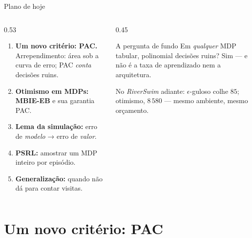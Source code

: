 \documentclass[aspectratio=169, 11pt]{beamer}
\begin{document}
\begin{frame}{Plano de hoje}
  \begin{columns}[T]
    \begin{column}{0.53\textwidth}
      \begin{enumerate}
        \item \textbf{Um novo critério: PAC.} Arrependimento: área sob a curva de
              erro; PAC \emph{conta} decisões ruins.
        \item \textbf{Otimismo em MDPs: MBIE-EB} e sua garantia PAC.
        \item \textbf{Lema da simulação:} erro de \emph{modelo} → erro de
              \emph{valor}.
        \item \textbf{PSRL:} amostrar um MDP inteiro por episódio.
        \item \textbf{Generalização:} quando não dá para contar visitas.
      \end{enumerate}
    \end{column}
    \begin{column}{0.45\textwidth}
      \begin{teobox}{A pergunta de fundo}
        Em \emph{qualquer} MDP tabular, \alert{polinomial} decisões ruins? Sim ---
        e não é a taxa de aprendizado nem a arquitetura.
      \end{teobox}
      \begin{ideiabox}
        No \textit{RiverSwim} adiante: $\epsilon$-guloso colhe $85$; otimismo,
        $8\,580$ --- mesmo ambiente, mesmo orçamento.
      \end{ideiabox}
    \end{column}
  \end{columns}
\end{frame}

\section{Um novo critério: PAC}
\end{document}
